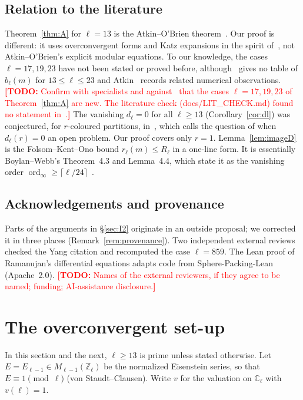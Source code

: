 \documentclass[11pt]{amsart}
\newcommand{\Zl}{\mathbb{Z}_\ell}
\newcommand{\Cl}{\mathbb{C}_\ell}
\DeclareMathOperator{\ord}{ord}
\newcommand{\TODO}[1]{\textcolor{red}{\textbf{[TODO:} #1\textbf{]}}}
\theoremstyle{plain}
\theoremstyle{definition}
\numberwithin{equation}{section}
\begin{document}
\subsection{Relation to the literature}
Theorem~\ref{thm:A} for $\ell=13$ is the Atkin--O'Brien theorem~\cite{AtkinOBrien1967}. Our proof is different: it
uses overconvergent forms and Katz expansions in the spirit of~\cite{Katz1973,Coleman1996,Buzzard2003,Vonk2015}, not
Atkin--O'Brien's explicit modular equations. To our knowledge, the cases $\ell=17,19,23$ have not been stated or proved
before, although~\cite{BoylanWebb2013} gives no table of $b_\ell(m)$ for $13\le\ell\le23$ and Atkin~\cite{Atkin1968}
records related numerical observations.
\TODO{Confirm with specialists and against~\cite{Atkin1968} that the cases $\ell=17,19,23$ of Theorem~\ref{thm:A} are
new. The literature check (docs/LIT\_CHECK.md) found no statement in~\cite{BoylanWebb2013,FKO2012,BLMT2014,Webb2011,ElGuindyGhazy2024}.}
The vanishing $d_\ell=0$ for all $\ell\ge13$ (Corollary~\ref{cor:dl}) was conjectured, for $r$-coloured partitions,
in~\cite{BLMT2014}, which calls the question of when $d_\ell(r)=0$ an open problem. Our proof covers only $r=1$.
Lemma~\ref{lem:imageD} is the Folsom--Kent--Ono bound $r_\ell(m)\le R_\ell$ in a one-line form. It is essentially
Boylan--Webb's Theorem~4.3 and Lemma~4.4, which state it as the vanishing order
$\ord_\infty\ge\lceil\ell/24\rceil$~\cite{BoylanWebb2013}.

\subsection*{Acknowledgements and provenance}
Parts of the arguments in \S\ref{sec:I2} originate in an outside proposal; we corrected it in three places
(Remark~\ref{rem:provenance}). Two independent external reviews checked the Yang citation and recomputed the case
$\ell=859$. The Lean proof of Ramanujan's differential equations adapts code from Sphere-Packing-Lean~\cite{SpherePackingLean}
(Apache~2.0). \TODO{Names of the external reviewers, if they agree to be named; funding; AI-assistance disclosure.}

\section{The overconvergent set-up}\label{sec:setup}

In this section and the next, $\ell\ge13$ is prime unless stated otherwise. Let $E=E_{\ell-1}\in M_{\ell-1}(\Zl)$ be the
normalized Eisenstein series, so that $E\equiv1\pmod\ell$ (von Staudt--Clausen). Write $v$ for the valuation on $\Cl$
with $v(\ell)=1$.
\end{document}
